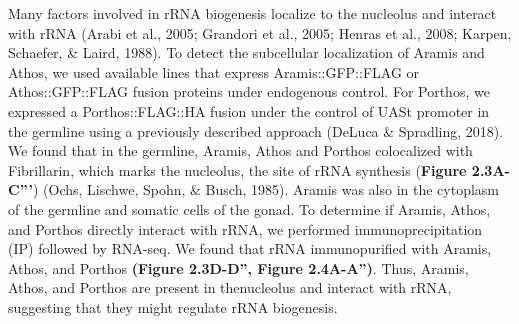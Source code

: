\documentclass[12pt,oneside]{reedthesis}
\begin{document}
Many factors involved in rRNA biogenesis localize to the nucleolus and
interact with rRNA (Arabi et al., 2005; Grandori et al., 2005; Henras et al., 2008; Karpen, Schaefer, \& Laird, 1988). To detect
the subcellular localization of Aramis and Athos, we used available
lines that express Aramis::GFP::FLAG or Athos::GFP::FLAG fusion proteins
under endogenous control. For Porthos, we expressed a Porthos::FLAG::HA
fusion under the control of UASt promoter in the germline using a
previously described approach (DeLuca \& Spradling, 2018).
We found that in the germline, Aramis, Athos and Porthos colocalized
with Fibrillarin, which marks the nucleolus, the site of rRNA synthesis
(\textbf{Figure 2.3A-C'''}) (Ochs, Lischwe, Spohn, \& Busch, 1985). Aramis was
also in the cytoplasm of the germline and somatic cells of the gonad. To
determine if Aramis, Athos, and Porthos directly interact with rRNA, we
performed immunoprecipitation (IP) followed by RNA-seq. We found that
rRNA immunopurified with Aramis, Athos, and Porthos \textbf{(Figure 2.3D-D'', Figure 2.4A-A'')}.
Thus, Aramis, Athos, and Porthos are present in thenucleolus and interact with rRNA,
suggesting that they might regulate rRNA biogenesis.
\end{document}
